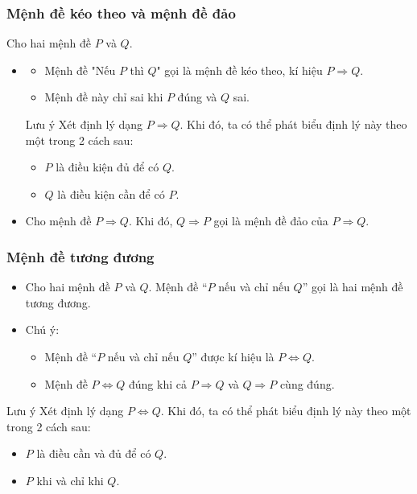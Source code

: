 \subsubsection{Mệnh đề kéo theo và mệnh đề đảo}
	Cho hai mệnh đề $P$ và $Q$.
		\begin{itemize}
			\item[\iconMT] 
				\begin{note}
			\begin{itemize}
				\item  Mệnh đề "Nếu $P$ thì $Q$" gọi là mệnh đề kéo theo, kí hiệu  $P\Rightarrow Q$.
				\item  Mệnh đề này chỉ sai khi $P$ đúng và $Q$ sai.
			\end{itemize}
					\end{note}
				\begin{khung4}{Lưu ý}
					Xét định lý dạng $P\Rightarrow Q$. Khi đó, ta có thể phát biểu định lý này theo một trong 2 cách sau:
					\begin{itemize}
						\item[\ding{172}] $P$ là điều kiện đủ để có $Q$.
						\item[\ding{173}] $Q$ là điều kiện cần để có $P$.
					\end{itemize}
				\end{khung4}
			\item[\iconMT]  Cho mệnh đề $P\Rightarrow Q$. Khi đó, $Q\Rightarrow P$ gọi là mệnh đề đảo của $P\Rightarrow Q$.
			\end{itemize}
\subsubsection{Mệnh đề tương đương}
\begin{itemize}
	\item [\iconMT] Cho hai mệnh đề $P$ và $Q$. Mệnh đề ``$P$ nếu và chỉ nếu $Q$''  gọi là hai mệnh đề tương đương.
	\item [\iconMT] Chú ý:
	\begin{note}
	\begin{itemize}
		\item  Mệnh đề ``$P$ nếu và chỉ nếu $Q$'' được kí hiệu là $P\Leftrightarrow Q$.
		\item 	Mệnh đề $P\Leftrightarrow Q$ đúng khi cả $P\Rightarrow Q$ và $Q\Rightarrow P$ cùng đúng.
	\end{itemize}
	\end{note}
\end{itemize}
			\begin{khung4}{Lưu ý}
				Xét định lý dạng $P \Leftrightarrow Q$. Khi đó, ta có thể phát biểu định lý này theo một trong 2 cách sau:
				\begin{itemize}
					\item[\ding{172}] $P$ là điều cần và đủ để có $Q$.
					\item[\ding{173}] $P$ khi và chỉ khi $Q$.
				\end{itemize}
			\end{khung4}
